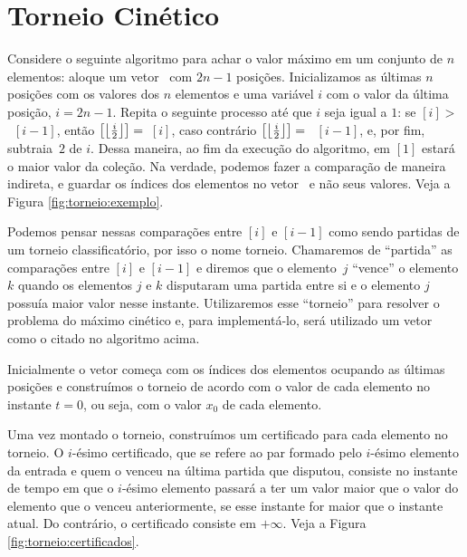 
\newcommand{\thickness}{0.75mm}
\FloatBarrier
\section{Torneio Cinético} \label{torneio:secao}

Considere o seguinte algoritmo para achar o valor máximo em um
conjunto de $n$ elementos: aloque um vetor \torneio~com $2n - 1$
posições. Inicializamos as últimas $n$ posições com os valores dos
$n$ elementos e uma variável $i$ com o valor da última posição, $i =
2n - 1$. Repita o seguinte processo até que $i$ seja igual a $1$: se
\torneio$[i] > $~\torneio$[i - 1]$, então
\torneio$\left[\left\lfloor \frac{i}{2} \right\rfloor\right] =$~\torneio$[i]$, caso
contrário \torneio$\left[\left\lfloor \frac{i}{2} \right\rfloor\right] =$~ \torneio$[i
- 1]$, e, por fim, subtraia~$2$ de $i$. Dessa maneira, ao fim da
execução do algoritmo, em \torneio$[1]$ estará o maior valor da
coleção. Na verdade, podemos fazer a comparação de maneira indireta,
e guardar os índices dos elementos no vetor \torneio~e não seus
valores. Veja a Figura \ref{fig:torneio:exemplo}.

Podemos pensar nessas comparações entre \torneio$[i]$ e
\torneio$[i-1]$ como sendo partidas de um torneio classificatório,
por isso o nome torneio. Chamaremos de ``partida'' as comparações
entre \torneio$[i]$ e \torneio$[i-1]$ e diremos que o elemento~$j$
``vence'' o elemento $k$ quando os elementos $j$ e $k$ disputaram
uma partida entre si e o elemento $j$ possuía maior valor nesse
instante. Utilizaremos esse ``torneio'' para resolver o problema do
máximo cinético e, para implementá-lo, será utilizado um vetor como
o citado no algoritmo acima.



Inicialmente o vetor começa com os índices dos elementos ocupando as
últimas posições e construímos o torneio de acordo com o valor de
cada elemento no instante $t = 0$, ou seja, com o valor $x_0$ de
cada elemento.

Uma vez montado o torneio, construímos um certificado para cada
elemento no torneio. O $i$-ésimo certificado, que se refere ao par
formado pelo $i$-ésimo elemento da entrada e quem o venceu na última
partida que disputou, consiste no instante de tempo em que o
$i$-ésimo elemento passará a ter um valor maior que o valor do
elemento que o venceu anteriormente, se esse instante for maior que
o instante atual. Do contrário, o certificado consiste em $+\infty$.
Veja a Figura \ref{fig:torneio:certificados}.

